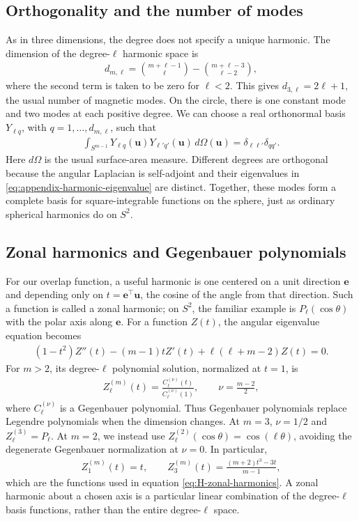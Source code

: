 \documentclass[11pt, reqno]{amsart}
\theoremstyle{notestyle}
\theoremstyle{defstyle}
\begin{document}
\subsection{Orthogonality and the number of modes}
As in three dimensions, the degree does not specify a unique harmonic.
The dimension of the degree-$\ell$ harmonic space is
\begin{align*}
    d_{m,\ell}
    =\binom{m+\ell-1}{\ell}-\binom{m+\ell-3}{\ell-2},
\end{align*}
where the second term is taken to be zero for $\ell<2$.
This gives $d_{3,\ell}=2\ell+1$, the usual number of magnetic modes.
On the circle, there is one constant mode and two modes at each positive degree.
We can choose a real orthonormal basis $Y_{\ell q}$, with $q=1,\ldots,d_{m,\ell}$, such that
\begin{align*}
    \int_{S^{m-1}}Y_{\ell q}(\mathbf u)Y_{\ell' q'}(\mathbf u)\,d\Omega(\mathbf u)
    =\delta_{\ell\ell'}\delta_{qq'}.
\end{align*}
Here $d\Omega$ is the usual surface-area measure.
Different degrees are orthogonal because the angular Laplacian is self-adjoint and their eigenvalues in \eqref{eq:appendix-harmonic-eigenvalue} are distinct.
Together, these modes form a complete basis for square-integrable functions on the sphere, just as ordinary spherical harmonics do on $S^2$.

\subsection{Zonal harmonics and Gegenbauer polynomials}
For our overlap function, a useful harmonic is one centered on a unit direction $\mathbf e$ and depending only on $t=\mathbf e^\top\mathbf u$, the cosine of the angle from that direction.
Such a function is called a zonal harmonic; on $S^2$, the familiar example is $P_\ell(\cos\theta)$ with the polar axis along $\mathbf e$.
For a function $Z(t)$, the angular eigenvalue equation becomes
\begin{align*}
    (1-t^2)Z''(t)-(m-1)tZ'(t)+\ell(\ell+m-2)Z(t)=0.
\end{align*}
For $m>2$, its degree-$\ell$ polynomial solution, normalized at $t=1$, is
\begin{align*}
    Z_\ell^{(m)}(t)
    =\frac{C_\ell^{(\nu)}(t)}{C_\ell^{(\nu)}(1)},
    \qquad \nu=\frac{m-2}{2},
\end{align*}
where $C_\ell^{(\nu)}$ is a Gegenbauer polynomial.
Thus Gegenbauer polynomials replace Legendre polynomials when the dimension changes.
At $m=3$, $\nu=1/2$ and $Z_\ell^{(3)}=P_\ell$.
At $m=2$, we instead use $Z_\ell^{(2)}(\cos\theta)=\cos(\ell\theta)$, avoiding the degenerate Gegenbauer normalization at $\nu=0$.
In particular,
\begin{align*}
    Z_1^{(m)}(t)=t,
    \qquad Z_3^{(m)}(t)=\frac{(m+2)t^3-3t}{m-1},
\end{align*}
which are the functions used in equation \eqref{eq:H-zonal-harmonics}.
A zonal harmonic about a chosen axis is a particular linear combination of the degree-$\ell$ basis functions, rather than the entire degree-$\ell$ space.
\end{document}
